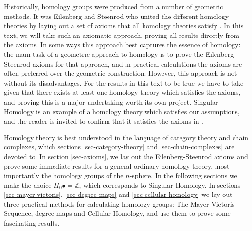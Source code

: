 Historically, homology groups were produced from a number of geometric methods. It was Eilenberg and Steenrod who united the different homology theories by laying out a set of axioms that all homology theories satisfy \cite{Eilenberg}. In this text, we will take such an axiomatic approach, proving all results directly from the axioms. In some ways this approach best captures the essence of homology: the main task of a geometric approach to homology is to prove the Eilenberg-Steenrod axioms for that approach, and in practical calculations the axioms are often preferred over the geometric construction. However, this approach is not without its disadvantages. For the results in this text to be true we have to take given that there exists at least one homology theory which satisfies the axioms, and proving this is a major undertaking worth its own project. Singular Homology is an example of a homology theory which satisfies our assumptions, and the reader is invited to confirm that it satisfies the axioms in \cite{Hatcher}.

Homology theory is best understood in the language of category theory and chain complexes, which sections \ref{sec-category-theory} and \ref{sec-chain-complexes} are devoted to. In section \ref{sec-axioms}, we lay out the Eilenberg-Steenrod axioms and prove some immediate results for a general ordinary homology theory, most importantly the homology groups of the $n$-sphere. In the following sections we make the choice $H_0 \bullet=\mathbb{Z}$, which corresponds to Singular Homology. In sections \ref{sec-mayer-vietoris}, \ref{sec-degree-maps} and \ref{sec-cellular-homology} we lay out three practical methods for calculating homology groups: The Mayer-Vietoris Sequence, degree maps and Cellular Homology, and use them to prove some fascinating results.